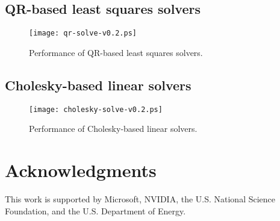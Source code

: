 \documentclass[10pt]{book}
\begin{document}
\newpage
\section{QR-based least squares solvers}
       \begin{figure}[!ht]
          \centering
          \hspace{-5mm}
          \texttt{[image: qr-solve-v0.2.ps]}
          \caption{Performance of QR-based least squares solvers.}
       \label{qr-solvers}
       \end{figure}

\newpage
\section{Cholesky-based linear solvers}
       \begin{figure}[!ht]
          \centering
          \hspace{-5mm}
          \texttt{[image: cholesky-solve-v0.2.ps]}
          \caption{Performance of Cholesky-based linear solvers.}
       \label{cholesky-solvers}
       \end{figure}




\chapter*{Acknowledgments}
This work is supported by Microsoft, NVIDIA, the U.S. National Science 
Foundation, and the U.S. Department of Energy.




\end{document}
